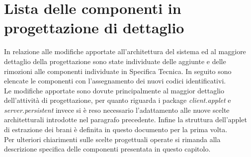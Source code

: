 \newpage
\section{Lista delle componenti in progettazione di dettaglio}
In relazione alle modifiche apportate all'architettura del sistema ed al
maggiore dettaglio della progettazione sono state individuate delle aggiunte e
delle rimozioni alle componenti individuate in Specifica Tecnica. In seguito
sono elencate le componenti con l'assegnamento dei nuovi codici
identificativi.\\
Le modifiche apportate sono dovute principalmente al maggior dettaglio
dell'attivit\`a di progettazione, per quanto riguarda i package
\emph{client.applet} e \emph{server.persistent} invece si \`e reso necessario
l'adattamento alle nuove scelte architetturali introdotte nel paragrafo
precedente. Infine la struttura dell'applet di estrazione dei brani \`e definita
in questo documento per la prima volta.\\
Per ulteriori chiarimenti sulle scelte progettuali operate si rimanda
alla descrizione specifica delle componenti presentata in questo capitolo.

